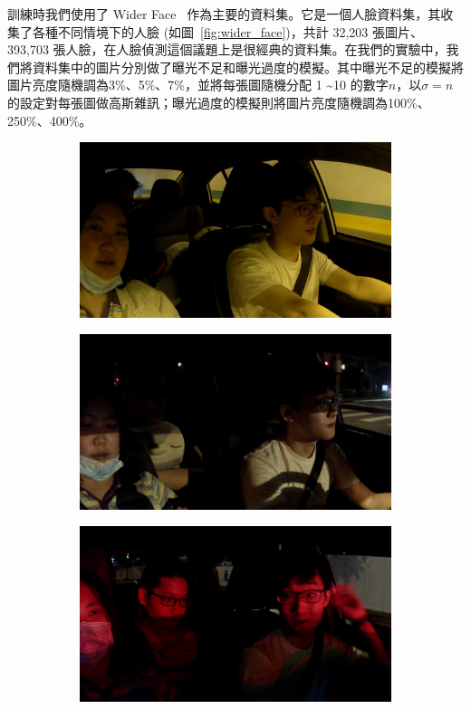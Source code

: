 訓練時我們使用了 Wider Face~\cite{yang2016wider} 作為主要的資料集。它是一個人臉資料集，其收集了各種不同情境下的人臉 (如圖~\ref{fig:wider_face})，共計 32,203 張圖片、393,703 張人臉，在人臉偵測這個議題上是很經典的資料集。在我們的實驗中，我們將資料集中的圖片分別做了曝光不足和曝光過度的模擬。其中曝光不足的模擬將圖片亮度隨機調為3\%、5\%、7\%，並將每張圖隨機分配 1 \textasciitilde 10 的數字$n$，以$\sigma = n$的設定對每張圖做高斯雜訊；曝光過度的模擬則將圖片亮度隨機調為100\%、250\%、400\%。

\begin{figure}[t]
\centering
\begin{subfigure}[b]{0.22\textwidth}
    \includegraphics[width=\textwidth]{figures/test_1_1}
\end{subfigure}
\begin{subfigure}[b]{0.22\textwidth}
    \includegraphics[width=\textwidth]{figures/test_2_1}
\end{subfigure}
\begin{subfigure}[b]{0.22\textwidth}
    \includegraphics[width=\textwidth]{figures/test_3_1}

\end{subfigure}
\end{figure}
